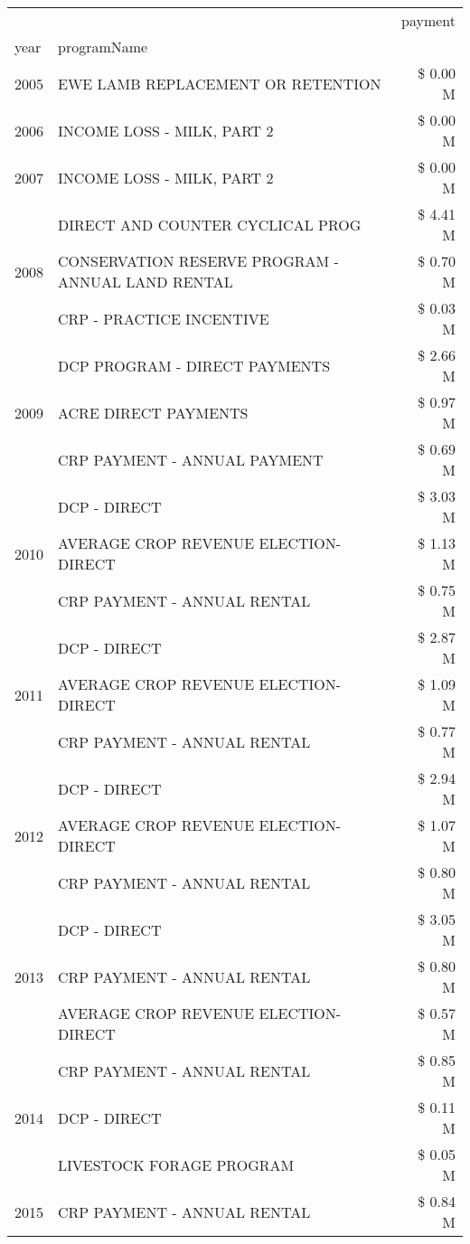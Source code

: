 \begin{tabular}{llr}
\toprule
 &  & payment \\
year & programName &  \\
\midrule
2005 & EWE LAMB REPLACEMENT OR RETENTION & \$ 0.00 M \\
\cline{1-3}
2006 & INCOME LOSS - MILK, PART 2 & \$ 0.00 M \\
\cline{1-3}
2007 & INCOME LOSS - MILK, PART 2 & \$ 0.00 M \\
\cline{1-3}
\multirow[t]{3}{*}{2008} & DIRECT AND COUNTER CYCLICAL PROG & \$ 4.41 M \\
 & CONSERVATION RESERVE PROGRAM - ANNUAL LAND RENTAL & \$ 0.70 M \\
 & CRP - PRACTICE INCENTIVE & \$ 0.03 M \\
\cline{1-3}
\multirow[t]{3}{*}{2009} & DCP PROGRAM - DIRECT PAYMENTS & \$ 2.66 M \\
 & ACRE DIRECT PAYMENTS & \$ 0.97 M \\
 & CRP PAYMENT - ANNUAL PAYMENT & \$ 0.69 M \\
\cline{1-3}
\multirow[t]{3}{*}{2010} & DCP - DIRECT & \$ 3.03 M \\
 & AVERAGE CROP REVENUE ELECTION-DIRECT & \$ 1.13 M \\
 & CRP PAYMENT - ANNUAL RENTAL & \$ 0.75 M \\
\cline{1-3}
\multirow[t]{3}{*}{2011} & DCP - DIRECT & \$ 2.87 M \\
 & AVERAGE CROP REVENUE ELECTION-DIRECT & \$ 1.09 M \\
 & CRP PAYMENT - ANNUAL RENTAL & \$ 0.77 M \\
\cline{1-3}
\multirow[t]{3}{*}{2012} & DCP - DIRECT & \$ 2.94 M \\
 & AVERAGE CROP REVENUE ELECTION-DIRECT & \$ 1.07 M \\
 & CRP PAYMENT - ANNUAL RENTAL & \$ 0.80 M \\
\cline{1-3}
\multirow[t]{3}{*}{2013} & DCP - DIRECT & \$ 3.05 M \\
 & CRP PAYMENT - ANNUAL RENTAL & \$ 0.80 M \\
 & AVERAGE CROP REVENUE ELECTION-DIRECT & \$ 0.57 M \\
\cline{1-3}
\multirow[t]{3}{*}{2014} & CRP PAYMENT - ANNUAL RENTAL & \$ 0.85 M \\
 & DCP - DIRECT & \$ 0.11 M \\
 & LIVESTOCK FORAGE PROGRAM & \$ 0.05 M \\
\cline{1-3}
\multirow[t]{3}{*}{2015} & CRP PAYMENT - ANNUAL RENTAL & \$ 0.84 M \\

\end{tabular}
